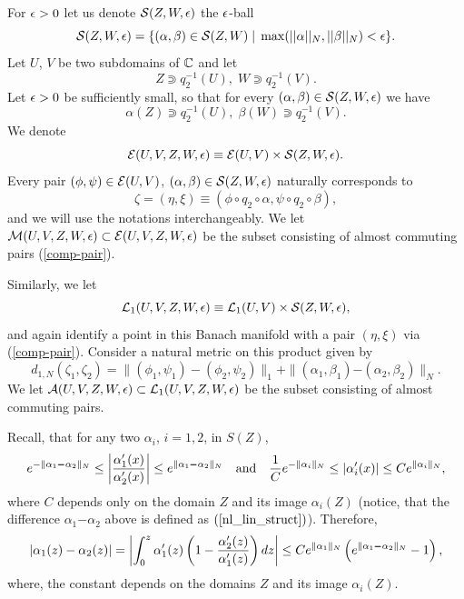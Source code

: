 For $\epsilon>0$ let us denote $\mathcal{S}(Z,W,\epsilon)$ the $\epsilon$-ball
$$\mathcal{S}(Z,W,\epsilon)=\{(\alpha,\beta)\in\mathcal{S}(Z,W)\;|\;\max(||\alpha||_N,||\beta||_N)<\epsilon\}.$$
Let $U$, $V$ be two subdomains of ${\Bbb C}$ and let $$Z\Supset q_2^{-1}(U),\;W\Supset q_2^{-1}(V).$$
Let $\epsilon>0$ be sufficiently small, so that for every $(\alpha,\beta)\in \mathcal{S}(Z,W,\epsilon)$ we have 
\begin{equation}\label{eq:domains}
\alpha(Z)\Supset q_2^{-1}(U),\;\beta(W)\Supset q_2^{-1}(V).
\end{equation} 
We denote $$\mathcal{E}(U,V,Z,W,\epsilon)\equiv \mathcal{E}(U,V)\times \mathcal{S}(Z,W,\epsilon).$$
Every pair $(\phi,\psi)\in\mathcal{E}(U,V)$, $(\alpha,\beta)\in \mathcal{S}(Z,W,\epsilon)$  naturally corresponds to  
\begin{equation}
\label{comp-pair}
\zeta=(\eta,\xi)\equiv (\phi\circ q_2\circ \alpha,\psi\circ q_2\circ \beta),
\end{equation}
and we will use the notations interchangeably.
We let $\mathcal{M}(U,V,Z,W,\epsilon)\subset\mathcal{E}(U,V,Z,W,\epsilon)$ be the subset consisting of almost commuting pairs (\ref{comp-pair}).

Similarly, we let
$$\mathcal{L}_1(U,V,Z,W,\epsilon)\equiv \mathcal{L}_1(U,V)\times \mathcal{S}(Z,W,\epsilon),$$
and again identify a point in this Banach manifold with a pair $(\eta,\xi)$ via (\ref{comp-pair}). 
Consider a natural metric on this product  given by 
\begin{equation}
\label{eq:unorm}d_{1,N}(\zeta_1,\zeta_2)=\|(\phi_1,\psi_1)-(\phi_2,\psi_2)\|_1+\|(\alpha_1,\beta_1) \pmb{-} (\alpha_2,\beta_2)\|_N.
\end{equation}
We let $\mathcal{A}(U,V,Z,W,\epsilon)\subset\mathcal{L}_1(U,V,Z,W,\epsilon)$ be the subset consisting of almost commuting pairs. 


Recall, that for any two $\alpha_i$, $i=1,2$, in  $S(Z)$,
\begin{equation}\label{n3a}
e^{-\| \alpha_1  \pmb{-} \alpha_2 \|_N } \le \left| { \alpha_1'(x) \over  \alpha_2'(x)} \right|  \le e^{\| \alpha_1 \pmb{-} \alpha_2 \|_N } \quad  {\rm and} \quad  {1 \over C} e^{-\| \alpha_i \|_N } \le \left| \alpha_i'(x) \right| \le C e^{\| \alpha_i \|_N },
\end{equation}
where $C$ depends only on the domain $Z$ and its image $\alpha_i(Z)$ (notice, that the difference  $\alpha_1  \pmb{-} \alpha_2$ above is defined as $(\ref{nl_lin_struct})$). Therefore,
\begin{equation}\label{n3}
|\alpha_1(z)-\alpha_2(z)|=\left| \int_0^z \alpha_1'(z) \left(1-{\alpha_2'(z) \over \alpha_1'(z) }  \right)  d z  \right| \le  C  e^{\| \alpha_1 \|_N } \left(e^{\| \alpha_1 \pmb{-}\alpha_2 \|_N }  -1 \right),   
\end{equation}
where, the constant depends on the domains $Z$ and its image $\alpha_i(Z)$.


